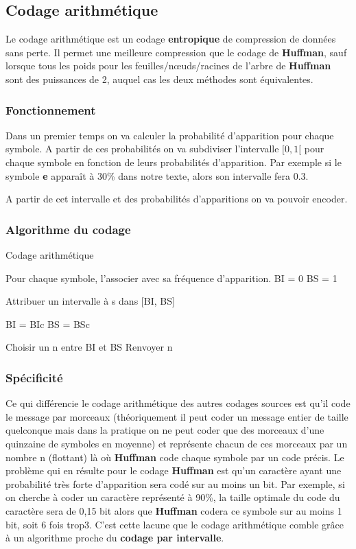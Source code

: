 \subsection{Codage arithmétique}

\par Le codage arithmétique est un codage \textbf{entropique} de compression de données sans perte. Il permet une meilleure compression que le codage de \textbf{Huffman}, sauf lorsque tous les poids pour les feuilles/nœuds/racines de l'arbre de \textbf{Huffman} sont des puissances de 2, auquel cas les deux méthodes sont équivalentes.

\subsubsection{Fonctionnement}
\par Dans un premier temps on va calculer la probabilité d'apparition pour chaque symbole. A partir de ces probabilités on va subdiviser l'intervalle $[0,1[$ pour chaque symbole en fonction de leurs probabilités d'apparition. Par exemple si le symbole \textbf{e} apparaît à 30\% dans notre texte, alors son intervalle fera 0.3.
\par A partir de cet intervalle et des probabilités d'apparitions on va pouvoir encoder.
\\

\subsubsection{Algorithme du codage}

\begin{algorithm}[H]
\caption{Codage arithmétique}
Pour chaque symbole, l'associer avec sa fréquence d'apparition.\;
BI = 0\; 
BS = 1\; 
{
	{    Attribuer un intervalle à s dans [BI, BS]
	}
	   
	BI = BIc\;
	BS = BSc\;
}
Choisir un n entre BI et BS\;
Renvoyer n\;
\end{algorithm}


\subsubsection{Spécificité}
Ce qui différencie le codage arithmétique des autres codages sources est qu'il code le message par morceaux (théoriquement il peut coder un message entier de taille quelconque mais dans la pratique on ne peut coder que des morceaux d'une quinzaine de symboles en moyenne) et représente chacun de ces morceaux par un nombre n (flottant) là où \textbf{Huffman} code chaque symbole par un code précis. Le problème qui en résulte pour le codage \textbf{Huffman} est qu'un caractère ayant une probabilité très forte d'apparition sera codé sur au moins un bit. Par exemple, si on cherche à coder un caractère représenté à 90\%, la taille optimale du code du caractère sera de 0,15 bit alors que \textbf{Huffman} codera ce symbole sur au moins 1 bit, soit 6 fois trop3. C'est cette lacune que le codage arithmétique comble grâce à un algorithme proche du \textbf{codage par intervalle}. 

